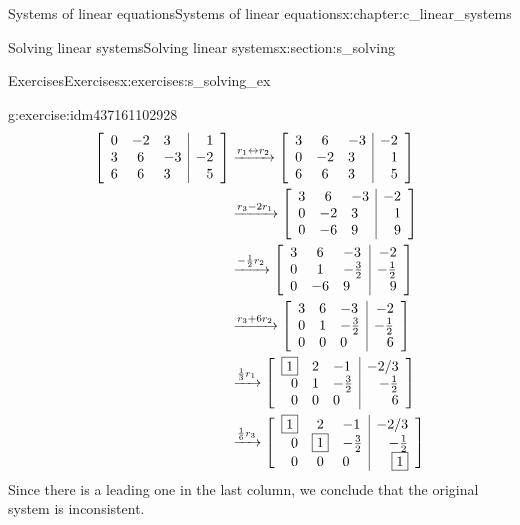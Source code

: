 \documentclass[oneside,10pt,]{book}
\numberwithin{equation}{section}
\newenvironment{amatrix}[1][ccc|c]{\left[\begin{array}{#1}}{\end{array}\right]}
\newcommand{\amp}{&}
\begin{document}
\begin{chapterptx}{Systems of linear equations}{}{Systems of linear equations}{}{}{x:chapter:c_linear_systems}
\begin{sectionptx}{Solving linear systems}{}{Solving linear systems}{}{}{x:section:s_solving}
\begin{exercises-subsection-numberless}{Exercises}{}{Exercises}{}{}{x:exercises:s_solving_ex}
\begin{exercisegroup}
\begin{divisionexerciseeg}{4}{}{}{g:exercise:idm437161102928}
\begin{align*}
\begin{amatrix}[rcl|r] 0\amp -2\amp 3\amp 1\\
3\amp 6\amp -3\amp -2\\
6\amp 6\amp 3\amp 5 \end{amatrix} \amp \xrightarrow[]{r_1 \leftrightarrow r_2} \begin{amatrix}[rcl|r] 3\amp 6\amp -3\amp -2\\
0\amp -2\amp 3\amp 1\\
6\amp 6\amp 3\amp 5 \end{amatrix}\\
\amp \xrightarrow[]{r_3-2r_1} \begin{amatrix}[rcl|r] 3\amp 6\amp -3\amp -2\\
0\amp -2\amp 3\amp 1\\
0\amp -6\amp 9\amp 9 \end{amatrix}\\
\amp \xrightarrow[]{-\frac{1}{2}r_2} \begin{amatrix}[rcl|r] 3\amp 6\amp -3\amp -2\\
0\amp 1\amp -\frac{3}{2}\amp -\frac{1}{2}\\
0\amp -6\amp 9\amp 9 \end{amatrix}\\
\amp \xrightarrow[]{r_3+6r_2} \begin{amatrix}[rcl|r] 3\amp 6\amp -3\amp -2\\
0\amp 1\amp -\frac{3}{2}\amp -\frac{1}{2}\\
0\amp 0\amp 0\amp 6 \end{amatrix}\\
\amp \xrightarrow[]{\frac{1}{3}r_1} \begin{amatrix}[rcl|r] \boxed{1}\amp 2\amp -1\amp -2/3\\
0\amp 1\amp -\frac{3}{2}\amp -\frac{1}{2}\\
0\amp 0\amp 0\amp 6 \end{amatrix}\\
\amp \xrightarrow[]{\frac{1}{6}r_3} \begin{amatrix}[rcl|r] \boxed{1}\amp 2\amp -1\amp -2/3\\
0\amp \boxed{1}\amp -\frac{3}{2}\amp -\frac{1}{2}\\
0\amp 0\amp 0\amp \boxed{1} \end{amatrix}
\end{align*}
Since there is a leading one in the last column, we conclude that the original system is inconsistent.%
\end{divisionexerciseeg}%

\end{exercisegroup}
\end{exercises-subsection-numberless}
\end{sectionptx}
\end{chapterptx}
\end{document}
